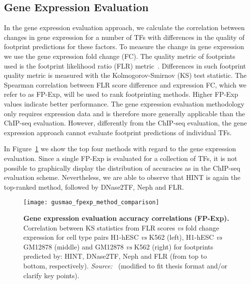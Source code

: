 \subsection{Gene Expression Evaluation}
\label{sec:mc.gene.expression.evaluation}

In the gene expression evaluation approach, we calculate the correlation between changes in gene expression for a number of TFs with differences in the quality of footprint predictions for these factors. To measure the change in gene expression we use the gene expression fold change (FC). The quality metric of footprints used is the footprint likelihood ratio (FLR) metric~\citep{yardimci2014}. Differences in such footprint quality metric is measured with the Kolmogorov-Smirnov (KS) test statistic. The Spearman correlation between FLR score difference and expression FC, which we refer to as FP-Exp, will be used to rank footprinting methods. Higher FP-Exp values indicate better performance. The gene expression evaluation methodology only requires expression data and is therefore more generally applicable than the ChIP-seq evaluation. However, differently from the ChIP-seq evaluation, the gene expression approach cannot evaluate footprint predictions of individual TFs.

In Figure~\ref{fig:gusmao_fpexp_method_comparison} we show the top four methods with regard to the gene expression evaluation. Since a single FP-Exp is evaluated for a collection of TFs, it is not possible to graphically display the distribution of accuracies as in the ChIP-seq evaluation scheme. Nevertheless, we are able to observe that HINT is again the top-ranked method, followed by DNase2TF, Neph and FLR.

\begin{figure}[h!]
\centering
\texttt{[image: gusmao\_fpexp\_method\_comparison]}
\caption[Gene expression evaluation accuracy correlations (FP-Exp)]{\textbf{Gene expression evaluation accuracy correlations (FP-Exp).} Correlation between KS statistics from FLR scores \textit{vs} fold change expression for cell type pairs H1-hESC \textit{vs} K562 (left), H1-hESC \textit{vs} GM12878 (middle) and GM12878 \textit{vs} K562 (right) for footprints predicted by: HINT, DNase2TF, Neph and FLR (from top to bottom, respectively). \emph{Source:~\cite{gusmao2016}} (modified to fit thesis format and/or clarify key points).}
\label{fig:gusmao_fpexp_method_comparison}
\end{figure}


